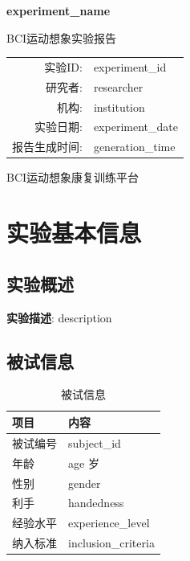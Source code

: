 \documentclass[12pt,a4paper]{article}
\begin{document}
\begin{titlepage}
    \centering
    \vspace*{2cm}
    
    {\Huge\bfseries {{ experiment_name }}\par}
    \vspace{1cm}
    {\Large BCI运动想象实验报告\par}
    \vspace{2cm}
    
    \begin{tabular}{rl}
        实验ID: & {{ experiment_id }} \\
        研究者: & {{ researcher }} \\
        机构: & {{ institution }} \\
        实验日期: & {{ experiment_date }} \\
        报告生成时间: & {{ generation_time }} \\
    \end{tabular}
    
    \vfill
    {\large BCI运动想象康复训练平台}
\end{titlepage}

\tableofcontents
\newpage

\section{实验基本信息}

\subsection{实验概述}
\textbf{实验描述}: {{ description }}

\subsection{被试信息}
\begin{table}[H]
    \centering
    \begin{tabular}{ll}
        \toprule
        项目 & 内容 \\
        \midrule
        被试编号 & {{ subject_id }} \\
        年龄 & {{ age }}岁 \\
        性别 & {{ gender }} \\
        利手 & {{ handedness }} \\
        经验水平 & {{ experience_level }} \\
        纳入标准 & {{ inclusion_criteria }} \\
        \bottomrule
    \end{tabular}
    \caption{被试信息}
\end{table}
\end{document}
